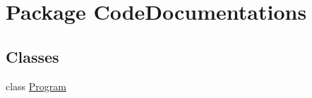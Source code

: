 \hypertarget{namespace_code_documentations}{\section{Package Code\-Documentations}
\label{namespace_code_documentations}
}
\subsection*{Classes}
\begin{DoxyCompactItemize}
\item 
class \hyperlink{class_code_documentations_1_1_program}{Program}
\end{DoxyCompactItemize}

